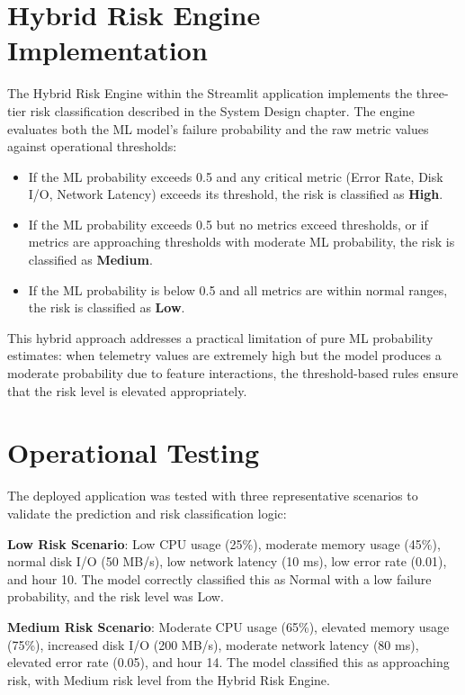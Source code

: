 \documentclass[12pt,letterpaper]{report}
\begin{document}
\section{Hybrid Risk Engine Implementation}

The Hybrid Risk Engine within the Streamlit application implements the three-tier risk classification described in the System Design chapter. The engine evaluates both the ML model's failure probability and the raw metric values against operational thresholds:

\begin{itemize}
  \item If the ML probability exceeds 0.5 and any critical metric (Error Rate, Disk I/O, Network Latency) exceeds its threshold, the risk is classified as \textbf{High}.
  \item If the ML probability exceeds 0.5 but no metrics exceed thresholds, or if metrics are approaching thresholds with moderate ML probability, the risk is classified as \textbf{Medium}.
  \item If the ML probability is below 0.5 and all metrics are within normal ranges, the risk is classified as \textbf{Low}.
\end{itemize}

This hybrid approach addresses a practical limitation of pure ML probability estimates: when telemetry values are extremely high but the model produces a moderate probability due to feature interactions, the threshold-based rules ensure that the risk level is elevated appropriately.

\section{Operational Testing}

The deployed application was tested with three representative scenarios to validate the prediction and risk classification logic:

\textbf{Low Risk Scenario}: Low CPU usage (25\%), moderate memory usage (45\%), normal disk I/O (50 MB/s), low network latency (10 ms), low error rate (0.01), and hour 10. The model correctly classified this as Normal with a low failure probability, and the risk level was Low.

\textbf{Medium Risk Scenario}: Moderate CPU usage (65\%), elevated memory usage (75\%), increased disk I/O (200 MB/s), moderate network latency (80 ms), elevated error rate (0.05), and hour 14. The model classified this as approaching risk, with Medium risk level from the Hybrid Risk Engine.
\end{document}
